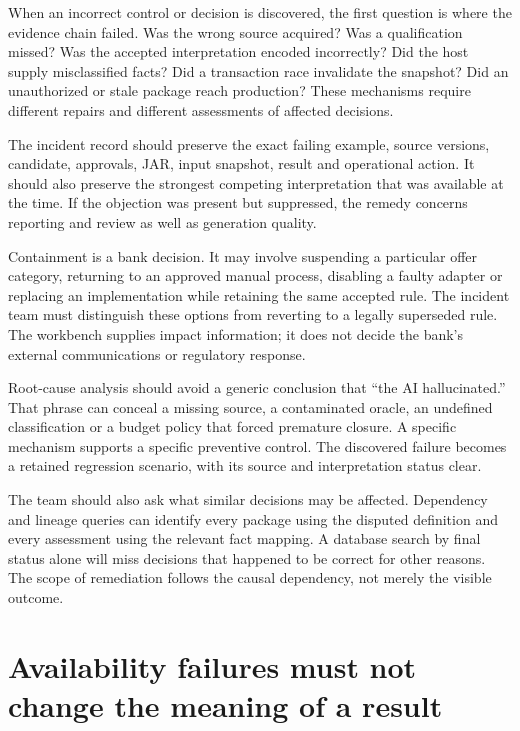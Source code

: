 When an incorrect control or decision is discovered, the first question is where
the evidence chain failed. Was the wrong source acquired? Was a qualification
missed? Was the accepted interpretation encoded incorrectly? Did the host supply
misclassified facts? Did a transaction race invalidate the snapshot? Did an
unauthorized or stale package reach production? These mechanisms require different
repairs and different assessments of affected decisions.

The incident record should preserve the exact failing example, source versions,
candidate, approvals, JAR, input snapshot, result and operational action. It
should also preserve the strongest competing interpretation that was available
at the time. If the objection was present but suppressed, the remedy concerns
reporting and review as well as generation quality.


Containment is a bank decision. It may involve suspending a particular offer
category, returning to an approved manual process, disabling a faulty adapter or
replacing an implementation while retaining the same accepted rule. The incident
team must distinguish these options from reverting to a legally superseded rule.
The workbench supplies impact information; it does not decide the bank's external
communications or regulatory response.

Root-cause analysis should avoid a generic conclusion that ``the AI hallucinated.''
That phrase can conceal a missing source, a contaminated oracle, an undefined
classification or a budget policy that forced premature closure. A specific
mechanism supports a specific preventive control. The discovered failure becomes
a retained regression scenario, with its source and interpretation status clear.

The team should also ask what similar decisions may be affected. Dependency and
lineage queries can identify every package using the disputed definition and
every assessment using the relevant fact mapping. A database search by final
status alone will miss decisions that happened to be correct for other reasons.
The scope of remediation follows the causal dependency, not merely the visible
outcome.

\section{Availability failures must not change the meaning of a result}
\label{merge:M10:09}


